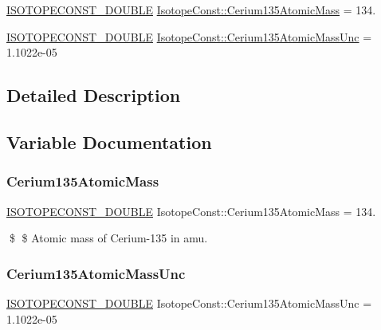 \begin{DoxyCompactItemize}
\item 
\mbox{\hyperlink{group___isotope_const-_macros_ga8f45a7272ce02c0b4c65c44636ed719a}{I\+S\+O\+T\+O\+P\+E\+C\+O\+N\+S\+T\+\_\+\+D\+O\+U\+B\+LE}} \mbox{\hyperlink{group___isotope_const-_cerium-_ce135_ga402ebec2b2b1404e097aa79b2853a905}{Isotope\+Const\+::\+Cerium135\+Atomic\+Mass}} = 134.
\item 
\mbox{\hyperlink{group___isotope_const-_macros_ga8f45a7272ce02c0b4c65c44636ed719a}{I\+S\+O\+T\+O\+P\+E\+C\+O\+N\+S\+T\+\_\+\+D\+O\+U\+B\+LE}} \mbox{\hyperlink{group___isotope_const-_cerium-_ce135_ga01fef069a092ea4ef00d73552dbe09a9}{Isotope\+Const\+::\+Cerium135\+Atomic\+Mass\+Unc}} = 1.\+1022e-\/05
\end{DoxyCompactItemize}


\subsection{Detailed Description}


\subsection{Variable Documentation}
\mbox{\label{group___isotope_const-_cerium-_ce135_ga402ebec2b2b1404e097aa79b2853a905}} 
\subsubsection{\texorpdfstring{Cerium135\+Atomic\+Mass}{Cerium135AtomicMass}}
{\footnotesize\ttfamily \mbox{\hyperlink{group___isotope_const-_macros_ga8f45a7272ce02c0b4c65c44636ed719a}{I\+S\+O\+T\+O\+P\+E\+C\+O\+N\+S\+T\+\_\+\+D\+O\+U\+B\+LE}} Isotope\+Const\+::\+Cerium135\+Atomic\+Mass = 134.}

\$ \$ Atomic mass of Cerium-\/135 in amu. \mbox{\label{group___isotope_const-_cerium-_ce135_ga01fef069a092ea4ef00d73552dbe09a9}} 
\subsubsection{\texorpdfstring{Cerium135\+Atomic\+Mass\+Unc}{Cerium135AtomicMassUnc}}
{\footnotesize\ttfamily \mbox{\hyperlink{group___isotope_const-_macros_ga8f45a7272ce02c0b4c65c44636ed719a}{I\+S\+O\+T\+O\+P\+E\+C\+O\+N\+S\+T\+\_\+\+D\+O\+U\+B\+LE}} Isotope\+Const\+::\+Cerium135\+Atomic\+Mass\+Unc = 1.\+1022e-\/05}

